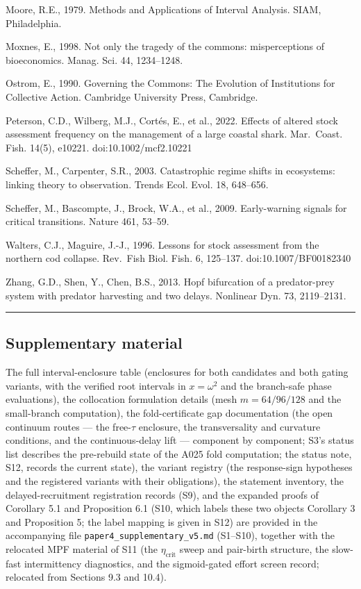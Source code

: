 \documentclass[11pt]{article}
\begin{document}
Moore, R.E., 1979. Methods and Applications of Interval Analysis. SIAM,
Philadelphia.

Moxnes, E., 1998. Not only the tragedy of the commons: misperceptions of
bioeconomics. Manag. Sci. 44, 1234--1248.

Ostrom, E., 1990. Governing the Commons: The Evolution of Institutions
for Collective Action. Cambridge University Press, Cambridge.

Peterson, C.D., Wilberg, M.J., Cort\'es, E., et al., 2022. Effects of
altered stock assessment frequency on the management of a large coastal
shark. Mar.~Coast. Fish. 14(5), e10221. doi:10.1002/mcf2.10221

Scheffer, M., Carpenter, S.R., 2003. Catastrophic regime shifts in
ecosystems: linking theory to observation. Trends Ecol. Evol. 18,
648--656.

Scheffer, M., Bascompte, J., Brock, W.A., et al., 2009. Early-warning
signals for critical transitions. Nature 461, 53--59.

Walters, C.J., Maguire, J.-J., 1996. Lessons for stock assessment from
the northern cod collapse. Rev.~Fish Biol. Fish. 6, 125--137.
doi:10.1007/BF00182340

Zhang, G.D., Shen, Y., Chen, B.S., 2013. Hopf bifurcation of a
predator-prey system with predator harvesting and two delays. Nonlinear
Dyn. 73, 2119--2131.

\begin{center}\rule{0.5\linewidth}{0.5pt}\end{center}

\subsection{Supplementary material}\label{supplementary-material}

The full interval-enclosure table (enclosures for both candidates and
both gating variants, with the verified root intervals in
\(x = \omega^2\) and the branch-safe phase evaluations), the collocation
formulation details (mesh \(m = 64/96/128\) and the small-branch
computation), the fold-certificate gap documentation (the open continuum
routes --- the free-\(\tau\) enclosure, the transversality and curvature
conditions, and the continuous-delay lift --- component by component;
S3's status list describes the pre-rebuild state of the A025 fold
computation; the status note, S12, records the current state), the
variant registry (the response-sign hypotheses and the registered
variants with their obligations), the statement inventory, the
delayed-recruitment registration records (S9), and the expanded proofs
of Corollary 5.1 and Proposition 6.1 (S10, which labels these two
objects Corollary 3 and Proposition 5; the label mapping is given in
S12) are provided in the accompanying file
\texttt{paper4\_supplementary\_v5.md} (S1--S10), together with the
relocated MPF material of S11 (the \(\eta_{\mathrm{crit}}\) sweep and
pair-birth structure, the slow-fast intermittency diagnostics, and the
sigmoid-gated effort screen record; relocated from Sections 9.3 and
10.4).
\end{document}
